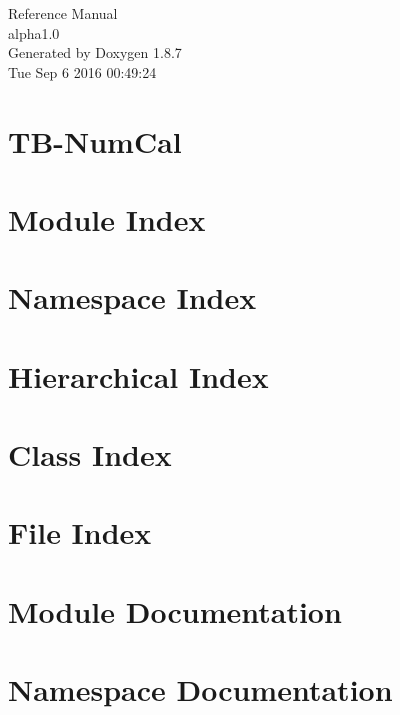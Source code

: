 \documentclass[twoside]{book}
\newcommand{\+}{\discretionary{\mbox{\scriptsize$\hookleftarrow$}}{}{}}
\newcommand{\clearemptydoublepage}{%
  \newpage{\pagestyle{empty}\cleardoublepage}%
}
\begin{document}
\hypersetup{pageanchor=false,
             bookmarks=true,
             bookmarksnumbered=true,
             pdfencoding=unicode
            }
\begin{titlepage}
\vspace*{7cm}
\begin{center}%
{\Large Reference Manual\\[1ex]\large alpha1.\+0 }\\
\vspace*{1cm}
{\large Generated by Doxygen 1.8.7}\\
\vspace*{0.5cm}
{\small Tue Sep 6 2016 00:49:24}\\
\end{center}
\end{titlepage}
\clearemptydoublepage
\tableofcontents
\clearemptydoublepage
{}
\hypersetup{pageanchor=true}

\chapter{T\+B-\/\+Num\+Cal}
\label{index}\hypertarget{index}{}
\chapter{Module Index}

\chapter{Namespace Index}

\chapter{Hierarchical Index}

\chapter{Class Index}

\chapter{File Index}

\chapter{Module Documentation}


\chapter{Namespace Documentation}









\end{document}
